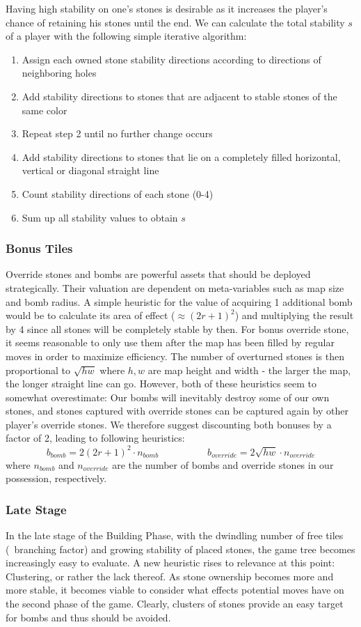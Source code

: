 Having high stability on one's stones is desirable as it increases the player's chance of retaining his stones until the end. We can calculate the total stability $s$ of a player with the following simple iterative algorithm:

\begin{enumerate}
\item Assign each owned stone stability directions according to directions of neighboring holes
\item Add stability directions to stones that are adjacent to stable stones of the same color
\item Repeat step 2 until no further change occurs
\item Add stability directions to stones that lie on a completely filled horizontal, vertical or diagonal straight line
\item Count stability directions of each stone (0-4)
\item Sum up all stability values to obtain $s$
\end{enumerate}


\subsubsection{Bonus Tiles}
Override stones and bombs are powerful assets that should be deployed strategically. Their valuation are dependent on meta-variables such as map size and bomb radius. A simple heuristic for the value of acquiring 1 additional bomb would be to calculate its area of effect ($\approx (2r+1)^2$) and multiplying the result by 4 since all stones will be completely stable by then. For bonus override stone, it seems reasonable to only use them after the map has been filled by regular moves in order to maximize efficiency. The number of overturned stones is then proportional to $\sqrt{hw}$ where $h, w$ are map height and width - the larger the map, the longer straight line can go. However, both of these heuristics seem to somewhat overestimate: Our bombs will inevitably destroy some of our own stones, and stones captured with override stones can be captured again by other player's override stones. We therefore suggest discounting both bonuses by a factor of 2, leading to following heuristics: 
\[ b_{bomb} = 2(2r+1)^2 \cdot n_{bomb} \quad \quad \quad \quad \quad b_{override} = 2 \sqrt{hw} \cdot n_{override}\]
where $n_{bomb}$ and $n_{override}$ are the number of bombs and override stones in our possession, respectively.
 
\subsubsection{Late Stage}
In the late stage of the Building Phase, with the dwindling number of free tiles (~branching factor) and growing stability of placed stones, the game tree becomes increasingly easy to evaluate. A new heuristic rises to relevance at this point: Clustering, or rather the lack thereof. As stone ownership becomes more and more stable, it becomes viable to consider what effects potential moves have on the second phase of the game. Clearly, clusters of stones provide an easy target for bombs and thus should be avoided. 

